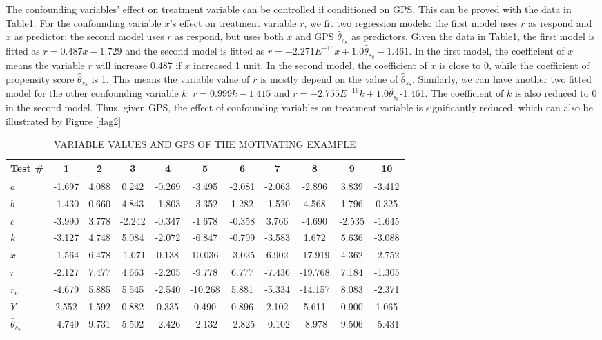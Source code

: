 The confounding variables' effect on treatment variable can be controlled if conditioned on GPS. This can be proved with the data in Table\ref{exampledata}. For the confounding variable $x$'s effect on treatment variable $r$, we fit two regression models: the first model uses $r$ as respond and $x$ as predictor; the second model uses $r$ as respond, but uses both $x$ and GPS ${\hat{\theta}}_{s_8}$ as predictors. Given the data in Table\ref{exampledata}, the first model is fitted as $ r =0.487x-1.729$ and the second model is fitted as $r=-2.271E^{-16}x+ 1.0{\hat{\theta}}_{s_8}-1.461$. In the first model, the coefficient of $x$ means the variable $r$ will increase 0.487 if $x$ increased 1 unit. In the second model, the coefficient of $x$ is close to 0, while the coefficient of propensity score ${\hat{\theta}}_{s_8}$ is 1. This means the variable value of $r$ is mostly depend on the value of  ${\hat{\theta}}_{s_8}$. Similarly, we can have another two fitted model for the other confounding variable $k$: $r=0.999k-1.415$  and $r=-2.755E^{-16}k+1.0{\hat{\theta}}_{s_8}$-1.461.  The coefficient of $k$ is also reduced to 0 in the second model.  Thus, given GPS, the effect of confounding variables on treatment variable is significantly reduced, which can also be illustrated by Figure \ref{dag2}

\begin{table}[htbp!]
\fontsize{10pt}{10pt}\selectfont
\centering
\caption{VARIABLE VALUES AND GPS OF THE MOTIVATING EXAMPLE}
\label{exampledata}
      \begin{tabular}{|l|c|c|c|c|c|c|c|c|c|c|}
      \hline
Test \#	&1	&2&3&4 & 5 &6& 7 & 8 & 9&10\\	\hline

$a$ &-1.697	&	4.088	&	0.242	&	-0.269	&	-3.495	&	-2.081	&	-2.063	&	-2.896	&	3.839	&	-3.412 \\ 	\hline
$b$ & -1.430	&	0.660	&	4.843	&	-1.803	&	-3.352	&	1.282	&	-1.520	&	4.568	&	1.796	&	0.325\\	\hline
$c$ & -3.990	&	3.778	&	-2.242	&	-0.347	&	-1.678	&	-0.358	&	3.766	&	-4.690	&	-2.535	&	-1.645 \\	\hline
$k$ & -3.127	&	4.748	&	5.084	&	-2.072	&	-6.847	&	-0.799	&	-3.583	&	1.672	&	5.636	&	-3.088\\	\hline
$x$ &-1.564	&	6.478	&	-1.071	&	0.138	&	10.036	&	-3.025	&	6.902	&	-17.919	&	4.362	&	-2.752 \\	\hline
$r $& -2.127	&	7.477	&	4.663	&	-2.205	&	-9.778	&	6.777	&	-7.436	&	-19.768	&	7.184	&	-1.305\\	\hline
$r_c$ & -4.679	&	5.885	&	5.545	&	-2.540	&	-10.268	&	5.881	&	-5.334	&	-14.157	&	8.083	&	-2.371 \\	\hline
$Y$ & 2.552	&	1.592	&	0.882	&	0.335	&	0.490	&	0.896	&	2.102	&	5.611	&	0.900	&	1.065 \\	\hline
${\hat{\theta}}_{s_8}$ & -4.749	&	9.731	&	5.502	&	-2.426	&	-2.132	&	-2.825	&	-0.102	&	-8.978	&	9.506	&	-5.431\\	\hline

\end{tabular}
\end{table}


